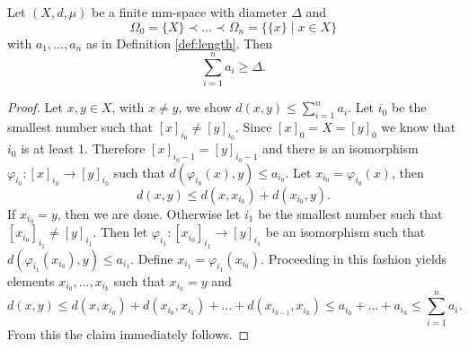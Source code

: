 \begin{lemma}\label{lem:diamLen}
	Let $(X,d,\mu)$ be a finite mm-space with diameter $\Delta$ and %
	\[\Omega_0=\{X\}\prec\dots\prec\Omega_n=\{\{x\}\mid x\in X\}\]
	with $a_1,\dots,a_n$ as in Definition \ref{def:length}. Then 
	\[\sum_{i=1}^{n}a_i\geq \Delta.\]
\end{lemma}
\begin{proof}
	Let $x,y\in X$, with $x\neq y$, we show $d(x,y)\leq\sum_{i=1}^{n}a_i$. Let $i_0$ be the smallest number such that $[x]_{i_0}\neq [y]_{i_0}$. Since $[x]_0=X=[y]_0$ we know that $i_0$ is at least 1. Therefore $[x]_{i_0-1}=[y]_{i_0-1}$ and there is an isomorphism $\varphi_{i_0}\colon[x]_{i_0}\to[y]_{i_0}$ such that $d(\varphi_{i_0}(x),y)\leq a_{i_0}$. %
	Let $x_{i_0}=\varphi_{i_0}(x)$, then 
	\[d(x,y)\leq d(x,x_{i_0})+d(x_{i_0},y).\]
	If $x_{i_0}=y$, then we are done. Otherwise let $i_1$ be the smallest number such that $[x_{i_0}]_{i_1}\neq [y]_{i_1}$. Then let $\varphi_{i_1}\colon[x_{i_0}]_{i_1}\to[y]_{i_1}$ be an isomorphism such that $d(\varphi_{i_1}(x_{i_0}),y)\leq a_{i_1}$. Define $x_{i_1}=\varphi_{i_1}(x_{i_0})$. Proceeding in this fashion yields elements $x_{i_0},\dots,x_{i_k}$ such that $x_{i_k}=y$ and
	\[d(x,y)\leq d(x,x_{i_0})+d(x_{i_0},x_{i_1})+\dots+d(x_{i_{k-1}},x_{i_k})\leq a_{i_0}+\dots +a_{i_k}\leq\sum_{i=1}^{n}a_i.\]
	From this the claim immediately follows.
\end{proof}
		
